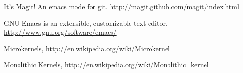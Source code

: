 \cleardoublepage
{}
{}
\begin{thebibliography}{99}

 It's Magit! An emacs mode for git.
  \url{ http://magit.github.com/magit/index.html}

 GNU Emacs is an extensible, customizable text editor.
  \url{http://www.gnu.org/software/emacs/}

 Microkernels,
  \url{http://en.wikipedia.org/wiki/Microkernel}

 Monolithic Kernels,
  \url{http://en.wikipedia.org/wiki/Monolithic_kernel}

\end{thebibliography}
